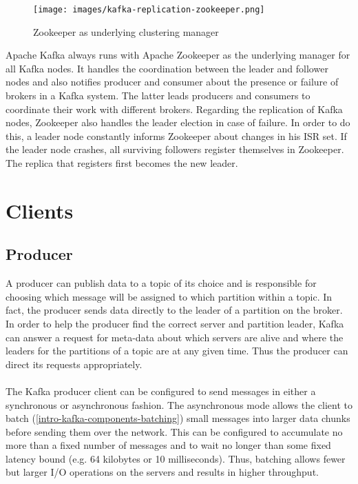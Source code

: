 \begin{figure}[H]
    \centering
    \texttt{[image: images/kafka-replication-zookeeper.png]}
    \caption{Zookeeper as underlying clustering manager \cite{ArtKafkaInfoQ}}
    \label{fig:the-log}
\end{figure}

Apache Kafka always runs with Apache Zookeeper as the underlying manager for all
Kafka nodes. It handles the coordination between the leader and follower nodes
and also notifies producer and consumer about the presence or failure of brokers in a
Kafka system. The latter leads producers and consumers to coordinate their work
with different brokers. Regarding the replication of Kafka nodes, Zookeeper
also handles the leader election in case of failure. In order to do this, a leader node
constantly informs Zookeeper about changes in his ISR set. If the leader node
crashes, all surviving followers register themselves in Zookeeper. The replica that
registers first becomes the new leader. \cite{kafka-wiki-replication}
\cite{ArtKafkaInfoQ} \cite{apacheZookeeper}

\section{Clients}

\subsection{Producer}

A producer can publish data to a topic of its choice and is responsible for
choosing which message will be assigned to which partition within a topic. In
fact, the producer sends data directly to the leader of a partition on the
broker. In order to help the producer find the correct server and partition
leader, Kafka can answer a request for meta-data about which servers are alive
and where the leaders for the partitions of a topic are at any given time. Thus
the producer can direct its requests appropriately. \cite{apachekafka}
\\ \\
The Kafka producer client can be configured to send messages in either a
synchronous or asynchronous fashion. The asynchronous mode allows the client to
batch (\ref{intro-kafka-components-batching}) small messages into larger data
chunks before sending them over the network. This can be configured to accumulate
no more than a fixed number of messages and to wait no longer than some fixed
latency bound (e.g. 64 kilobytes or 10 milliseconds). Thus, batching allows
fewer but larger I/O operations on the servers and results in higher throughput.
\cite{apachekafka} \cite{goodhope2012building}

